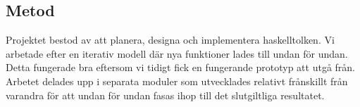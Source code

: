 \subsection{Metod}
Projektet bestod av att planera, designa och implementera haskelltolken. Vi arbetade efter en iterativ modell där nya funktioner lades till undan för undan. Detta fungerade bra eftersom vi tidigt fick en fungerande prototyp att utgå från. Arbetet delades upp i separata moduler som utvecklades relativt frånskillt från varandra för att undan för undan fasas ihop till det slutgiltliga resultatet. 





